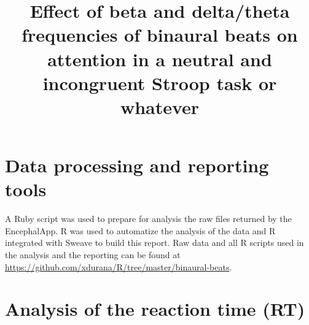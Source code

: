 \documentclass[12pt,a4paper]{article}
\begin{document}


\title{Effect of beta and delta/theta frequencies of binaural beats on attention in a neutral and incongruent Stroop task or whatever}
\date{}
\maketitle


\section*{Data processing and reporting tools}

A Ruby script was used to prepare for analysis the raw files returned by the EncephalApp. R was used to automatize the analysis of the data and R integrated with Sweave to build this report. Raw data and all R scripts used in the analysis and the reporting can be found at \url{https://github.com/xdurana/R/tree/master/binaural-beats}.

\section*{Analysis of the reaction time (RT)}
\end{document}
